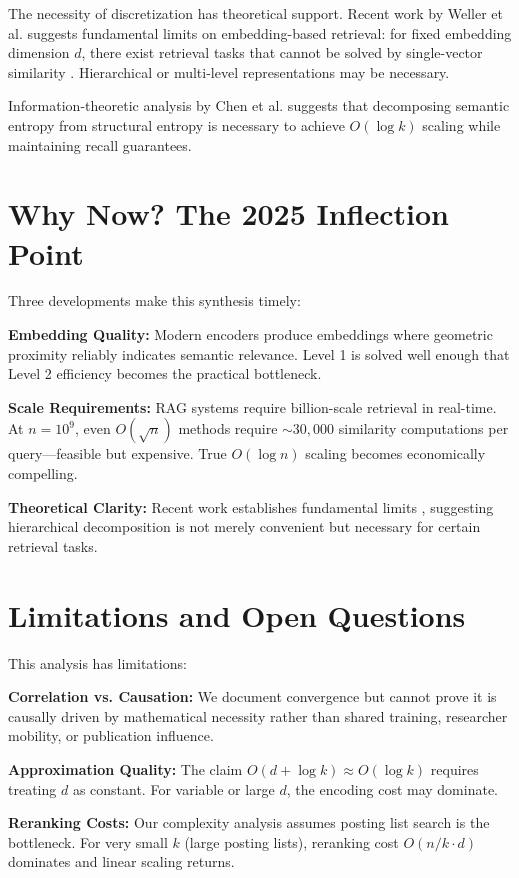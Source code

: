 \documentclass[manuscript,screen,nonacm]{acmart}
\begin{document}
The necessity of discretization has theoretical support. Recent work by Weller et al. suggests fundamental limits on embedding-based retrieval: for fixed embedding dimension $d$, there exist retrieval tasks that cannot be solved by single-vector similarity \cite{weller2025}. Hierarchical or multi-level representations may be necessary.

Information-theoretic analysis by Chen et al. \cite{chen2025} suggests that decomposing semantic entropy from structural entropy is necessary to achieve $O(\log k)$ scaling while maintaining recall guarantees.

\section{Why Now? The 2025 Inflection Point}

Three developments make this synthesis timely:

\textbf{Embedding Quality:} Modern encoders produce embeddings where geometric proximity reliably indicates semantic relevance. Level 1 is solved well enough that Level 2 efficiency becomes the practical bottleneck.

\textbf{Scale Requirements:} RAG systems require billion-scale retrieval in real-time. At $n = 10^9$, even $O(\sqrt{n})$ methods require $\sim 30,000$ similarity computations per query---feasible but expensive. True $O(\log n)$ scaling becomes economically compelling.

\textbf{Theoretical Clarity:} Recent work establishes fundamental limits \cite{weller2025, korten2025}, suggesting hierarchical decomposition is not merely convenient but necessary for certain retrieval tasks.

\section{Limitations and Open Questions}

This analysis has limitations:

\textbf{Correlation vs. Causation:} We document convergence but cannot prove it is causally driven by mathematical necessity rather than shared training, researcher mobility, or publication influence.

\textbf{Approximation Quality:} The claim $O(d + \log k) \approx O(\log k)$ requires treating $d$ as constant. For variable or large $d$, the encoding cost may dominate.

\textbf{Reranking Costs:} Our complexity analysis assumes posting list search is the bottleneck. For very small $k$ (large posting lists), reranking cost $O(n/k \cdot d)$ dominates and linear scaling returns.
\end{document}
